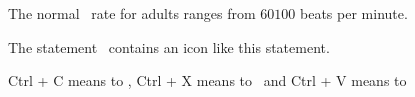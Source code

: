 \documentclass{article}
\begin{document}
	
	The normal \faHeartbeat\ rate for adults ranges from $60$\textendash $100$ beats per minute.
	
	The statement \faHandOUp\ contains an icon like this statement.
	
	Ctrl + C means to \faCopy, Ctrl + X means to \faCut\ and Ctrl + V means to \faPaste
\end{document}

